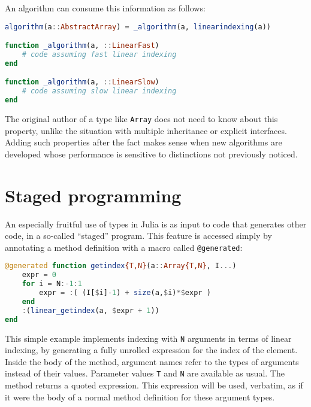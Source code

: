 \noindent
An algorithm can consume this information as follows:

\begin{singlespace}
\begin{lstlisting}[language=julia]
algorithm(a::AbstractArray) = _algorithm(a, linearindexing(a))

function _algorithm(a, ::LinearFast)
    # code assuming fast linear indexing
end

function _algorithm(a, ::LinearSlow)
    # code assuming slow linear indexing
end
\end{lstlisting}
\end{singlespace}

\noindent
The original author of a type like \texttt{Array} does not need to know
about this property, unlike the situation with multiple inheritance or
explicit interfaces.
Adding such properties after the fact makes sense when new algorithms
are developed whose performance is sensitive to distinctions not
previously noticed.


\section{Staged programming}
\label{sec:stagedprogramming}

An especially fruitful use of types in Julia is as input to code that
generates other code, in a so-called ``staged'' program.
This feature is accessed simply by annotating a method definition
with a macro called \texttt{@generated}:

\begin{singlespace}
\begin{lstlisting}[language=julia]
@generated function getindex{T,N}(a::Array{T,N}, I...)
    expr = 0
    for i = N:-1:1
        expr = :( (I[$i]-1) + size(a,$i)*$expr )
    end
    :(linear_getindex(a, $expr + 1))
end
\end{lstlisting}
\end{singlespace}

\noindent
This simple example implements indexing with \texttt{N} arguments
in terms of linear indexing, by generating a fully unrolled expression
for the index of the element.
Inside the body of the method, argument names refer to the types of
arguments instead of their values.
Parameter values \texttt{T} and \texttt{N} are available as usual.
The method returns a quoted expression.
This expression will be used, verbatim, as if it were the body of
a normal method definition for these argument types.


